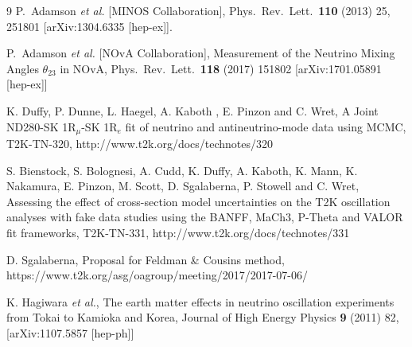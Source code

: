 \begin{thebibliography}{9}
  P.~Adamson {\it et al.}  [MINOS Collaboration],
  Phys.\ Rev.\ Lett.\  {\bf 110} (2013) 25,  251801
  [arXiv:1304.6335 [hep-ex]].

  P.~Adamson {\it et al.}  [NOvA Collaboration],
  Measurement of the Neutrino Mixing Angles $\theta_{23}$ in NOvA,
  Phys.\ Rev.\ Lett.\ {\bf 118} (2017) 151802
  [arXiv:1701.05891 [hep-ex]]

   K. Duffy, P. Dunne, L. Haegel, A. Kaboth , E. Pinzon and C. Wret,
   A Joint ND280-SK 1R$_\mu$-SK 1R$_e$ fit of neutrino and antineutrino-mode data using MCMC,
   T2K-TN-320,
   http://www.t2k.org/docs/technotes/320

   S. Bienstock, S. Bolognesi, A. Cudd, K. Duffy, A. Kaboth, K. Mann, K. Nakamura, E. Pinzon, M. Scott, D. Sgalaberna, P. Stowell and C. Wret,
   Assessing the effect of cross-section model uncertainties on the T2K oscillation analyses with fake data studies using the BANFF, MaCh3, P-Theta and VALOR fit frameworks,
   T2K-TN-331,
   http://www.t2k.org/docs/technotes/331

   D. Sgalaberna,
   Proposal for Feldman \& Cousins method,
   https://www.t2k.org/asg/oagroup/meeting/2017/2017-07-06/

   K. Hagiwara {\it et al.},
   The earth matter effects in neutrino oscillation experiments from Tokai to Kamioka and Korea,
   Journal of High Energy Physics {\bf 9} (2011) 82,
   [arXiv:1107.5857 [hep-ph]]

\end{thebibliography}



